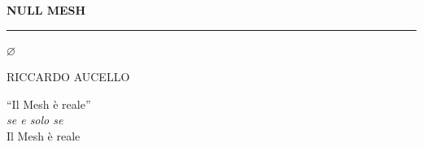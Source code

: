 \documentclass[11pt,twoside,openright]{book}
\begin{document}

\cleardoublepage

\begin{titlepage}
\thispagestyle{empty}
\vspace*{2in}

\begin{center}
{\fontsize{48pt}{48pt}\selectfont\bfseries\color{nullmesh-dark}NULL MESH}

\vspace{0.5em}
{\color{nullmesh-accent}\rule{4in}{2pt}}

\vspace{2em}
{\fontsize{20}{20pt}\sffamily\color{nullmesh-gray} $\varnothing$}

\vfill

{\large\sffamily\color{nullmesh-dark}RICCARDO AUCELLO}

\vspace{1em}
{\small\sffamily\color{nullmesh-ghost}``Il Mesh è reale'' \\ \textit{se e solo se} \\ Il Mesh è reale}
\end{center}
\end{titlepage}

\cleardoublepage

\frontmatter
\pagestyle{plain}



\clearpage


\clearpage


\mainmatter
\pagestyle{fancy}


\clearpage



\clearpage

\end{document}
